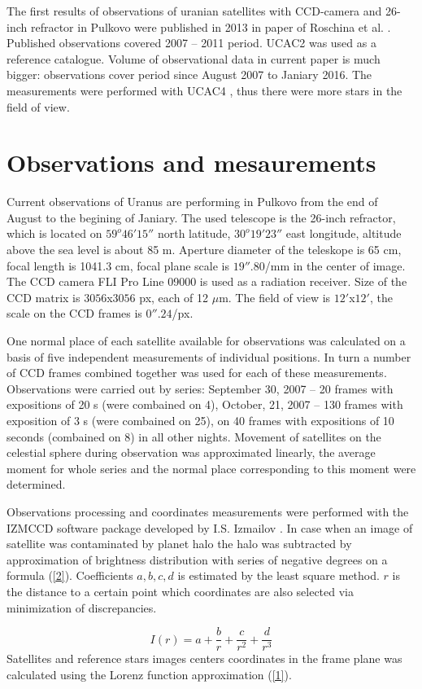 \documentclass[]{article}
\begin{document}
The first results of observations of uranian satellites with CCD-camera and 26-inch refractor in Pulkovo were published in 2013 in paper of Roschina et al. \cite{1}. Published observations covered 2007 -- 2011 period. UCAC2 was used as a reference catalogue. Volume of observational data in current paper is much bigger: observations cover period since August 2007 to Janiary 2016. The measurements were performed with UCAC4 \cite{9}, thus there were more stars in the field of view.

\section{Observations and mesaurements}
Current observations of Uranus are performing in Pulkovo from the end of August to the begining of Janiary. The used telescope is the 26-inch refractor, which is located on $59^o46' 15''$ north latitude, $30^o19'23''$ east longitude, altitude above the sea level is about 85 m.  Aperture diameter of the teleskope is 65 cm, focal length is 1041.3 cm, focal plane scale is $19''.80$/mm in the center of image. The CCD camera FLI Pro Line 09000  is used as a radiation receiver. Size of the CCD matrix is $3056$x$3056$ px, each of 12 $\mu$m.  The field of view is $12'$x$12'$, the scale on the CCD frames is $0''.24$/px.\par
One normal place of each satellite available for observations was calculated on a basis of five independent measurements of individual positions.  In turn a number of CCD frames combined together was used for each of these measurements. Observations were carried out by series: September 30, 2007 -- 20 frames with expositions of 20 s (were combained on 4), October, 21, 2007 -- 130 frames with exposition of 3 s (were combained on 25), on 40 frames with expositions of 10 seconds (combained on 8) in all other nights. Movement of satellites on the celestial sphere during observation was approximated linearly, the average moment for whole series and the normal place corresponding to this moment were determined.\par
Observations processing and coordinates measurements were performed with the IZMCCD software package developed by I.S. Izmailov \cite{3,4}. In case when an image of satellite was contaminated by planet halo the halo was subtracted by approximation of brightness distribution with series of negative degrees on a formula (\ref{2}). Coefficients $a, b, c, d$ is estimated by the least square method. $r$ is the distance to a certain point which coordinates are also selected via minimization of discrepancies.\par
\begin{equation}
\label{2}
I(r) = a + \frac{b}{r} + \frac{c}{r^2} + \frac{d}{r^3}
\end{equation}
Satellites and reference stars images centers coordinates  in the frame plane was calculated using the Lorenz function approximation (\ref{1}).
\end{document}
